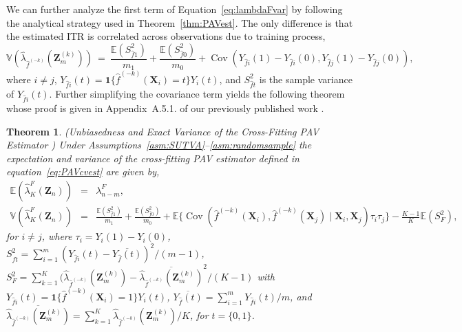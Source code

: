 \documentclass[USenglish,onecolumn]{article}
\DeclareMathOperator\Cov{Cov}
\newcommand\E{\mathbb{E}}
\newcommand\V{\mathbb{V}}
\newcommand\bX{\bm{X}}
\newcommand\bZ{\bm{Z}}
\newtheorem{theorem}{Theorem}
\begin{document}
We can further analyze the first term of
Equation~\eqref{eq:lambdaFvar} by following the analytical strategy
used in Theorem~\ref{thm:PAVest}.  The only difference is that the
estimated ITR is correlated across observations due to training
process,
\begin{equation}
  \V(\hat{\lambda}_{\hat{f}^{(-k)}}(\bZ_m^{(k)})) \ = \
  \frac{\E(S_{\hat{f}1}^2)}{m_1} + \frac{\E(S_{\hat{f}0}^2)}{m_0} +
  \Cov(Y_{\hat{f}i}(1)-Y_{\hat{f}i}(0), Y_{\hat{f}j}(1) - Y_{\hat{f}j}(0)),    
\end{equation}
where $i \ne j$,
$Y_{\hat{f}i}(t) = \mathbf{1}\{\hat{f}^{(-k)}(\bX_i)=t\}Y_i(t)$, and
$S^2_{\hat{f}t}$ is the sample variance of $Y_{\hat{f}i}(t)$.  Further
simplifying the covariance term yields the following theorem whose proof
is given in Appendix~A.5.1. of our previously published work
\citep{imai2021experimental}.
\begin{theorem} {\sc (Unbiasedness and Exact Variance of the
    Cross-Fitting PAV Estimator
    \cite{imai2021experimental})} \label{thm:PAVcvest} Under
  Assumptions~\ref{asm:SUTVA}--\ref{asm:randomsample} the expectation
  and variance of the cross-fitting PAV estimator defined in
  equation~\eqref{eq:PAVcvest} are given by,
	\begin{eqnarray*}
		\E(\hat{\lambda}_K^F(\bZ_n))  & = & \lambda_{n-m}^F, \\
		\V(\hat{\lambda}_K^F(\bZ_n))
		& = & \frac{\E(S_{\hat{f}1}^2)}{m_1} + \frac{\E(S_{\hat{f}0}^2)}{m_0} +
\E\Big\{\Cov(\hat{f}^{(-k)}(\bX_i), \hat{f}^{(-k)}(\bX_j)
		\mid \bX_i, \bX_j) \tau_i\tau_j \Big\}   -  \frac{K-1}{K}\E(S_{F}^2),
	\end{eqnarray*}
	for $i\neq j$, where $\tau_i = Y_i(1)-Y_i(0)$,
        $S_{\hat{f}t}^2 = \sum_{i=1}^{m} (Y_{\hat{f}i}(t) -
        \overline{Y_{\hat{f}}(t)})^2/(m-1)$,
        $S_{F}^2 = \sum_{k=1}^K
        (\hat\lambda_{\hat{f}^{(-k)}}(\bZ_{m}^{(k)}) -
        \overline{\hat\lambda_{\hat{f}^{(-k)}}(\bZ^{(k)}_m)}^2/(K-1)$
        with
        $Y_{\hat{f}i}(t) =
        \mathbf{1}\{\hat{f}^{(-k)}(\bX_i)=1\}Y_i(t)$,
        $\overline{Y_{\hat{f}}(t)} = \sum_{i=1}^{m}
        Y_{\hat{f}i}(t)/m$, and
        $\overline{\hat\lambda_{\hat{f}^{(-k)}}(\bZ_{m}^{(k)})} =
        \sum_{k=1}^K \hat\lambda_{\hat{f}^{(-k)}}(\bZ_{m}^{(k)})/K$,
        for $t=\{0,1\}$.
\end{theorem}
\end{document}
